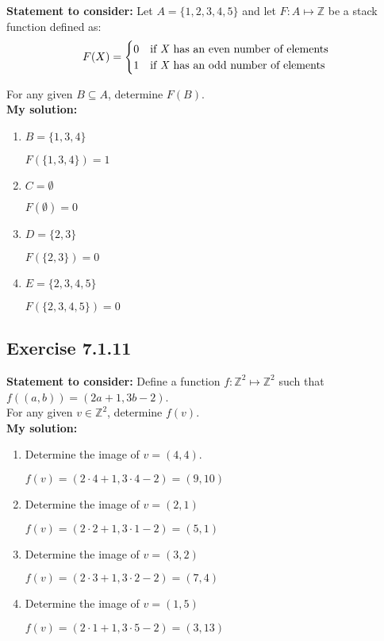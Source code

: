 \documentclass{article}
\newcommand{\cent}[1]{\begin{center}#1\end{center}}
\newcommand{\doubleZ}{\mathbb{Z}}
\newcommand{\In}{\! \in \!}
\newcommand{\Remark}{\textbf{Statement to consider: }}
\newcommand{\Solution}{\textbf{My solution: }}
\newcommand{\Exercise}[1]{\subsection*{Exercise #1}}
\begin{document}
 \Remark
 Let $A=\{1,2,3,4,5\}$ and let $F : A \mapsto \doubleZ$ be a stack function defined as:
 \[ F(X) = 
 \begin{cases}
 	0 &  \text{if \textit{X} has an even number of elements} \\
 	1 &  \text{if \textit{X} has an odd number of elements}
 \end{cases} 
 	\]
 	
 	For any given $B \subseteq A$, determine $F(B)$.\\
 	
 	\Solution
 	\begin{enumerate}[label=\textbf{\alph*.}]
 		\item $B= \{1,3,4\}$
 		
 		\cent{$F(\{1,3,4\}) = 1$}
 		
 		\item $C = \emptyset$
 		
 		\cent{$F(\emptyset) = 0$}
 		
 		\item $D = \{2,3\}$
 		
 		\cent{$ F(\{2,3\}) = 0 $}
 		
 		\item $E = \{2,3,4,5\}$
 		
 		\cent{$ F(\{2,3,4,5\}) = 0 $}
 	\end{enumerate}
 
 	\Exercise{7.1.11}
 	
 	\Remark
 	Define a function $f : \doubleZ^2 \mapsto \doubleZ^2$ such that $f((a,b)) = (2a+1,3b-2)$. \\
 	
 	For any given $v \In \doubleZ^2$, determine $f(v)$.\\
 	
 	\Solution
 	\begin{enumerate}[label=\textbf{\alph*.}]
 		\item Determine the image of  $v = (4,4)$.
 		
 		\cent{$f(v) = (2\cdot 4 + 1,3 \cdot 4 - 2) = (9,10)$}
 		
 		\item Determine the image of $v = (2,1)$
 		
 		\cent{$f(v) = (2\cdot 2 + 1,3 \cdot 1 - 2) = (5,1)$}
 		
 		\item Determine the image of $v = (3,2)$
 		
 		\cent{$f(v) = (2\cdot 3 + 1,3 \cdot 2 - 2) = (7,4)$}
 		
 		\item Determine the image of $v=(1,5)$
 		
 		\cent{$f(v) = (2\cdot 1 + 1,3 \cdot 5 - 2) = (3,13)$}
 		
 	\end{enumerate}
 
\end{document}
